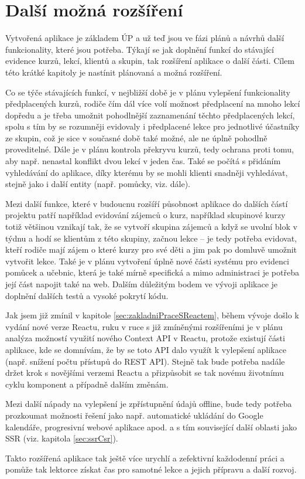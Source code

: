 \chapter{Další možná rozšíření}\label{dalsirozsireni}
Vytvořená aplikace je základem ÚP a už teď jsou ve fázi plánů a návrhů další funkcionality, které jsou potřeba. Týkají se jak doplnění funkcí do stávající evidence kurzů, lekcí, klientů a skupin, tak rozšíření aplikace o další části. Cílem této krátké kapitoly je nastínit plánovaná a možná rozšíření.

Co se týče stávajících funkcí, v nejbližší době je v plánu vylepšení funkcionality předplacených kurzů, rodiče čím dál více volí možnost předplacení na mnoho lekcí dopředu a je třeba umožnit pohodlnější zaznamenání těchto předplacených lekcí, spolu s tím by se rozumněji evidovaly i předplacené lekce pro jednotlivé účastníky ze skupin, což je sice v současné době také možné, ale ne úplně pohodlně proveditelné. Dále je v plánu kontrola překryvu kurzů, tedy ochrana proti tomu, aby např. nenastal konflikt dvou lekcí v jeden čas. Také se počítá s přidáním vyhledávání do aplikace, díky kterému by se mohli klienti snadněji vyhledávat, stejně jako i další entity (např. pomůcky, viz. dále).

Mezi další funkce, které v budoucnu rozšíří působnost aplikace do dalších částí projektu patří například evidování zájemců o kurz, například skupinové kurzy totiž většinou vznikají tak, že se vytvoří skupina zájemců a když se uvolní blok v týdnu a hodí se klientům z této skupiny, začnou lekce -- je tedy potřeba evidovat, kteří rodiče mají zájem o které kurzy pro své děti a jim pak po domluvě umožnit vytvořit lekce. Také je v plánu vytvoření úplně nové části systému pro evidenci pomůcek a učebnic, která je také mírně specifická a mimo administraci je potřeba její část napojit také na web. Dalším důležitým bodem ve vývoji aplikace je doplnění dalších testů a vysoké pokrytí kódu.

Jak jsem již zmínil v kapitole \ref{sec:zakladniPraceSReactem}, během vývoje došlo k vydání nové verze Reactu, ruku v ruce s již zmíněnými rozšířeními je v plánu analýza možností využití nového Context API v Reactu, protože existují části aplikace, kde se domnívám, že by se toto API dalo využít k vylepšení aplikace (např. snížení počtu přístupů do REST API). Stejně tak bude potřeba nadále držet krok s novějšími verzemi Reactu a přizpůsobit se tak novému životnímu cyklu komponent a případně dalším změnám.

Mezi další nápady na vylepšení je zpřístupnění údajů offline, bude tedy potřeba prozkoumat možnosti řešení jako např. automatické ukládání do Google kalendáře, progresivní webové aplikace apod. a s tím související další oblasti jako SSR (viz. kapitola \ref{sec:ssrCsr}).

Takto rozšířená aplikace tak ještě více urychlí a zefektivní každodenní práci a pomůže tak lektorce získat čas pro samotné lekce a jejich přípravu a další rozvoj.
